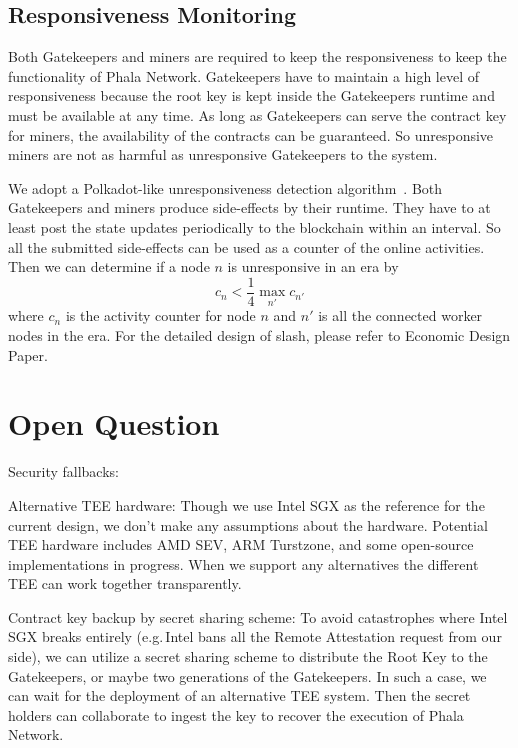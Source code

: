 \subsection{Responsiveness Monitoring}

Both Gatekeepers and miners are required to keep the responsiveness to keep the functionality of Phala Network. Gatekeepers have to maintain a high level of responsiveness because the root key is kept inside the Gatekeepers runtime and must be available at any time. As long as Gatekeepers can serve the contract key for miners, the availability of the contracts can be guaranteed. So unresponsive miners are not as harmful as unresponsive Gatekeepers to the system.

We adopt a Polkadot-like unresponsiveness detection algorithm~\cite{polkadotslashing}. Both Gatekeepers and miners produce side-effects by their runtime. They have to at least post the state updates periodically to the blockchain within an interval. So all the submitted side-effects can be used as a counter of the online activities. Then we can determine if a node $n$ is unresponsive in an era by
$$
    c_n < \frac{1}{4} \max\limits_{n'}{c_{n'}}
$$
where $c_n$ is the activity counter for node $n$ and $n'$ is all the connected worker nodes in the era. For the detailed design of slash, please refer to Economic Design Paper.


\section{Open Question}

Security fallbacks:

\begin{icompact}
    \item Alternative TEE hardware: Though we use Intel SGX as the reference for the current design, we don't make any assumptions about the hardware. Potential TEE hardware includes AMD SEV, ARM Turstzone, and some open-source implementations in progress. When we support any alternatives the different TEE can work together transparently.
    \item Contract key backup by secret sharing scheme: To avoid catastrophes where Intel SGX breaks entirely (e.g.\,Intel bans all the Remote Attestation request from our side), we can utilize a secret sharing scheme to distribute the Root Key to the Gatekeepers, or maybe two generations of the Gatekeepers. In such a case, we can wait for the deployment of an alternative TEE system. Then the secret holders can collaborate to ingest the key to recover the execution of Phala Network.
\end{icompact}

